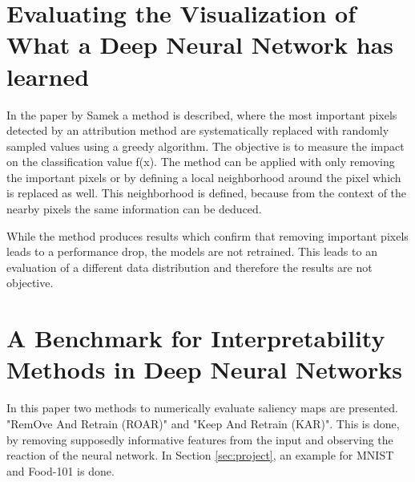 \section{Evaluating the Visualization of What a Deep Neural Network has learned}
\label{pertubation}

In the paper by Samek\cite{samek2017} a method is described, where the most important pixels detected by an attribution method are systematically replaced with randomly sampled values using a greedy algorithm. The objective is to measure the impact on the classification value f(x). The method can be applied with only removing the important pixels or by defining a local neighborhood around the pixel which is replaced as well. This neighborhood is defined, because from the context of the nearby pixels the same information can be deduced.

While the method produces results which confirm that removing important pixels leads to a performance drop, the models are not retrained. This leads to an evaluation of a different data distribution and therefore the results are not objective.

\section{A Benchmark for Interpretability Methods in Deep Neural Networks }

In this paper \cite{hooker2019benchmark} two methods to numerically evaluate saliency maps are presented. "RemOve And Retrain (ROAR)" and "Keep And Retrain (KAR)". This is done, by removing supposedly informative features from the input and observing the reaction of the neural network. In Section \ref{sec:project}, an example for MNIST and Food-101 is done.

